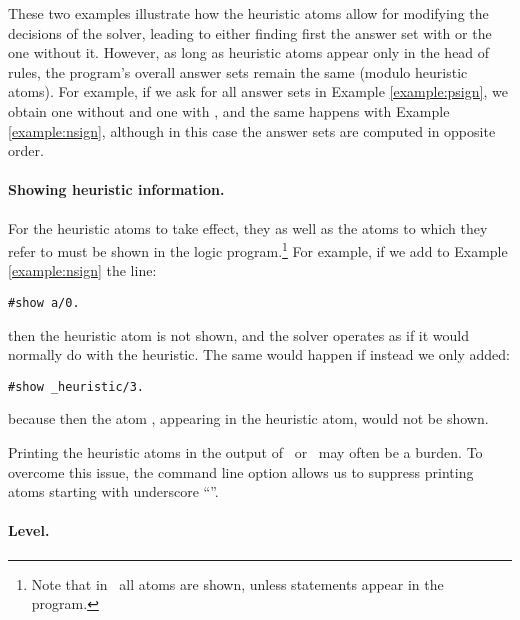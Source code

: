 These two examples illustrate how the heuristic atoms allow for modifying the decisions of the solver,
leading to either finding first the answer set with  or the one without it.
However, as long as heuristic atoms appear only in the head of rules,
the program's overall answer sets remain the same (modulo heuristic atoms).
For example, if we ask for all answer sets in Example \ref{example:psign},
we obtain one without  and one with ,
and the same happens with Example \ref{example:nsign}, 
although in this case the answer sets are computed in opposite order.

\paragraph{Showing heuristic information.}

For the heuristic atoms to take effect, they as well as the atoms to which they refer to
must be shown in the logic program.\footnote{Note that in \gringo\ all atoms are shown, 
  unless  statements appear in the program.}
For example, if we add to Example \ref{example:nsign} the line:
\begin{lstlisting}[numbers=none]
#show a/0.
\end{lstlisting}
then the heuristic atom is not shown, 
and the solver operates as if it would normally do with the  heuristic. 
The same would happen if instead we only added:
\begin{lstlisting}[numbers=none]
#show _heuristic/3.
\end{lstlisting}
because then the atom , appearing in the heuristic atom, would not be shown.

\begin{note}
Printing the heuristic atoms in the output of \clingo\ or \clasp\ may often be a burden.
To overcome this issue,
the command line option  allows us to suppress printing atoms starting with underscore ``\code{\_}''.
\end{note}

\paragraph{Level.}


